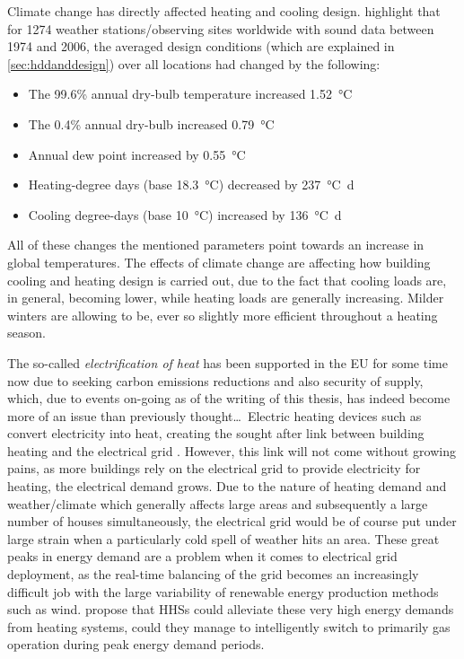Climate change has directly affected heating and cooling design.  highlight that for \num{1274} weather stations/observing sites worldwide with sound data between 1974 and 2006, the averaged design conditions (which are explained in \cref{sec:hddanddesign}) over all locations had changed by the following:
\begin{itemize}
    \item The 99.6\% annual dry-bulb temperature increased \SI{1.52}{\celsius}
    \item The 0.4\% annual dry-bulb increased \SI{0.79}{\celsius} 
    \item Annual dew point increased by \SI{0.55}{\celsius} 
    \item Heating-degree days (base \SI{18.3}{\celsius}) decreased by \SI{237}{\celsius\day} 
    \item Cooling degree-days (base \SI{10}{\celsius}) increased by \SI{136}{\celsius\day}
\end{itemize}
All of these changes the mentioned parameters point towards an increase in global temperatures. The effects of climate change are affecting how building cooling and heating design is carried out, due to the fact that cooling loads are, in general, becoming lower, while heating loads are generally increasing. Milder winters are allowing \HPs to be, ever so slightly more efficient throughout a heating season. 


The so-called \textit{electrification of heat} has been supported in the EU for some time now due to seeking carbon emissions reductions and also security of supply, which, due to events on-going as of the writing of this thesis, has indeed become more of an issue than previously thought\ldots\ Electric heating devices such as \HPs convert electricity into heat, creating the sought after link between building heating and the electrical grid \cite{heinen_electricity_2016}. However, this link will not come without growing pains, as more buildings rely on the electrical grid to provide electricity for heating, the electrical demand grows. Due to the nature of heating demand and weather/climate which generally affects large areas and subsequently a large number of houses simultaneously, the electrical grid would be of course put under large strain when a particularly cold spell of weather hits an area. These great peaks in energy demand are a problem when it comes to electrical grid deployment, as the real-time balancing of the grid becomes an increasingly difficult job with the large variability of renewable energy production methods such as wind. \cite{vuillecard_small_2011, thomasen_decarbonisation_2021} propose that \acp{HHS} could alleviate these very high energy demands from heating systems, could they manage to intelligently switch to primarily gas operation during peak energy demand periods. 


